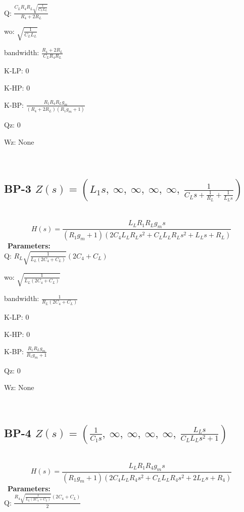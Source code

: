\documentclass{article}
\begin{document}
Q: $\frac{C_{L} R_{4} R_{L} \sqrt{\frac{1}{C_{L} L_{L}}}}{R_{4} + 2 R_{L}}$\ 

wo: $\sqrt{\frac{1}{C_{L} L_{L}}}$\ 

bandwidth: $\frac{R_{4} + 2 R_{L}}{C_{L} R_{4} R_{L}}$\ 

K-LP: $0$\ 

K-HP: $0$\ 

K-BP: $\frac{R_{1} R_{4} R_{L} g_{m}}{\left(R_{4} + 2 R_{L}\right) \left(R_{1} g_{m} + 1\right)}$\ 

Qz: $0$\ 

Wz: $\text{None}$\ 

\ 

\subsection{BP-3 $Z(s) = \left( L_{1} s, \  \infty, \  \infty, \  \infty, \  \infty, \  \frac{1}{C_{L} s + \frac{1}{R_{L}} + \frac{1}{L_{L} s}}\right)$ } \ 
\textbf{\[H(s) = \frac{L_{L} R_{1} R_{L} g_{m} s}{\left(R_{1} g_{m} + 1\right) \left(2 C_{4} L_{L} R_{L} s^{2} + C_{L} L_{L} R_{L} s^{2} + L_{L} s + R_{L}\right)}\] } \ 
\textbf{Parameters:}\\ 

Q: $R_{L} \sqrt{\frac{1}{L_{L} \left(2 C_{4} + C_{L}\right)}} \left(2 C_{4} + C_{L}\right)$\ 

wo: $\sqrt{\frac{1}{L_{L} \left(2 C_{4} + C_{L}\right)}}$\ 

bandwidth: $\frac{1}{R_{L} \left(2 C_{4} + C_{L}\right)}$\ 

K-LP: $0$\ 

K-HP: $0$\ 

K-BP: $\frac{R_{1} R_{L} g_{m}}{R_{1} g_{m} + 1}$\ 

Qz: $0$\ 

Wz: $\text{None}$\ 

\ 

\subsection{BP-4 $Z(s) = \left( \frac{1}{C_{1} s}, \  \infty, \  \infty, \  \infty, \  \infty, \  \frac{L_{L} s}{C_{L} L_{L} s^{2} + 1}\right)$ } \ 
\textbf{\[H(s) = \frac{L_{L} R_{1} R_{4} g_{m} s}{\left(R_{1} g_{m} + 1\right) \left(2 C_{4} L_{L} R_{4} s^{2} + C_{L} L_{L} R_{4} s^{2} + 2 L_{L} s + R_{4}\right)}\] } \ 
\textbf{Parameters:}\\ 

Q: $\frac{R_{4} \sqrt{\frac{1}{L_{L} \left(2 C_{4} + C_{L}\right)}} \left(2 C_{4} + C_{L}\right)}{2}$\ 
\end{document}
